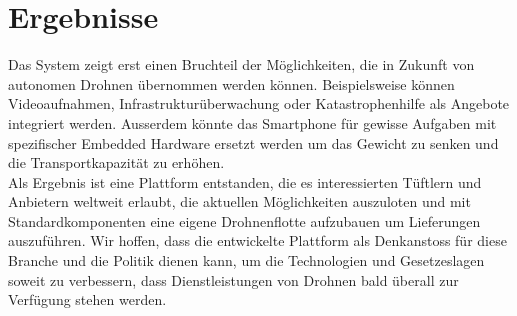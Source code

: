 \section*{Ergebnisse}
Das System zeigt erst einen Bruchteil der Möglichkeiten, die in Zukunft von autonomen Drohnen übernommen werden können. Beispielsweise können Videoaufnahmen, Infrastrukturüberwachung oder Katastrophenhilfe als Angebote integriert werden. Ausserdem könnte das Smartphone für gewisse Aufgaben mit spezifischer Embedded Hardware ersetzt werden um das Gewicht zu senken und die Transportkapazität zu erhöhen. \\

Als Ergebnis ist eine Plattform entstanden, die es interessierten Tüftlern und Anbietern weltweit erlaubt, die aktuellen Möglichkeiten auszuloten und mit Standardkomponenten eine eigene Drohnenflotte aufzubauen um Lieferungen auszuführen. Wir hoffen, dass die entwickelte Plattform als Denkanstoss für diese Branche und die Politik dienen kann, um die Technologien und Gesetzeslagen soweit zu verbessern, dass Dienstleistungen von Drohnen bald überall zur Verfügung stehen werden.
